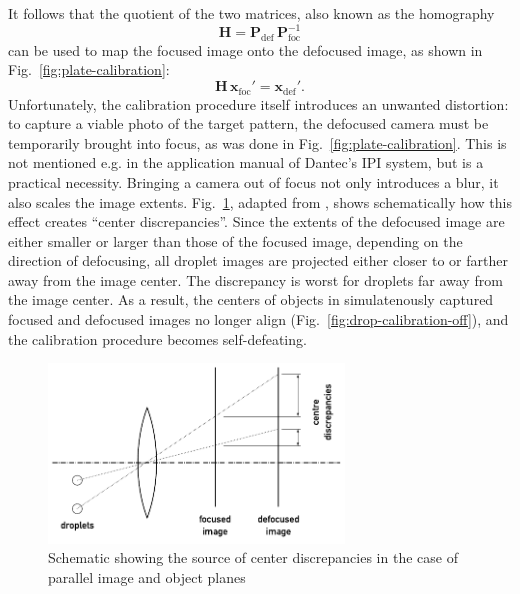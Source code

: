 \documentclass[11.5pt,oneside]{book}
\newcommand*{\figref}[1]{Fig.~\ref{#1}}
\begin{document}
It follows that the quotient of the two matrices, also known as the homography
\begin{equation}
    \mathbf{H} = \mathbf{P}_\text{def} \, \mathbf{P}_\text{foc}^{-1}
\end{equation}
can be used to map the focused image onto the defocused image, as shown in \figref{fig:plate-calibration}:
\begin{equation}
    \mathbf{H}\, \mathbf{x}_\text{foc}' = \mathbf{x}_\text{def}'.
    \label{homography-definition}
\end{equation}
Unfortunately, the calibration procedure itself introduces an unwanted
distortion: to capture a viable photo of the target pattern, the defocused
camera must be temporarily brought into focus, as was done in
\figref{fig:plate-calibration}. This is not mentioned e.g. in the
application manual of Dantec's IPI system, but is a practical necessity.
Bringing a camera out of focus not only introduces a blur, it also scales the
image extents. \figref{fig:discrepancy}, adapted from \citet{Hardalupas10},
shows schematically how this effect creates ``center discrepancies''. Since the
extents of the defocused image are either smaller or larger than those of the
focused image, depending on the direction of defocusing, all droplet images are
projected either closer to or farther away from the image center. The
discrepancy is worst for droplets far away from the image center. As a result,
the centers of objects in simulatenously captured focused and defocused images
no longer align (\figref{fig:drop-calibration-off}), and the calibration
procedure becomes self-defeating.

\begin{figure}
\centering
\includegraphics[width=0.7\textwidth]{img/orb/discrepancy.pdf}
\caption{Schematic showing the source of center discrepancies in the case of
parallel image and object planes \label{fig:discrepancy}}
\end{figure}
\end{document}
